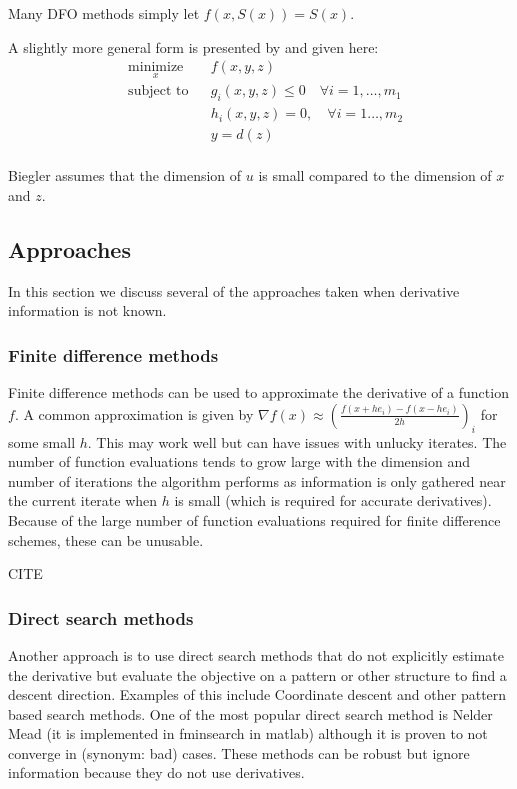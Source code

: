 \documentclass{article}
\begin{document}
Many DFO methods simply let $f(x,S(x)) = S(x)$.

A slightly more general form is presented by \cite{DUMMY:Biegler} and given here:
\begin{equation*}
\begin{aligned}
& \underset{x}{\text{minimize}} & & f(x, y, z) \\
& \text{subject to} & & g_i(x, y, z) \leq 0 \quad \forall i = 1, \ldots, m_1 \\
& & & h_i(x, y, z) = 0, \quad \forall i = 1 \ldots, m_2 \\
& & & y = d(z) \;  \\
\end{aligned}
\end{equation*}

Biegler assumes that the dimension of $u$ is small compared to the dimension of $x$ and $z$.

\subsection{Approaches}

In this section we discuss several of the approaches taken when derivative information is not known.

\subsubsection{Finite difference methods}
Finite difference methods can be used to approximate the derivative of a function $f$.
A common approximation is given by $\nabla f(x) \approx (\frac{f(x+he_i) - f(x-he_i)}{2h})_i$ for some small $h$.
This may work well but can have issues with unlucky iterates.
The number of function evaluations tends to grow large with the dimension and number of iterations the algorithm performs as information is only gathered near the current iterate when $h$ is small (which is required for accurate derivatives).
Because of the large number of function evaluations required for finite difference schemes, these can be unusable.

CITE


\subsubsection{Direct search methods}

Another approach is to use direct search methods that do not explicitly estimate the derivative but evaluate the objective on a pattern or other structure to find a descent direction.
Examples of this include Coordinate descent and other pattern based search methods.
One of the most popular direct search method is Nelder Mead (it is implemented in fminsearch in matlab) although it is proven to not converge in (synonym: bad) cases.
These methods can be robust but ignore information because they do not use derivatives.
\end{document}
